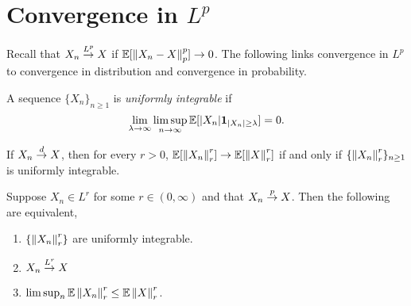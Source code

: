 \section{Convergence in $L^p$}
Recall that $X_n \stackrel{L^{p}}{\to} X$ if ${\mathbb{E}}[\left\|X_n-X\right\|_p^p] \to 0$. The following links convergence in $L^p$ to convergence in distribution and convergence in probability.
\begin{definition}
    A sequence $\{X_n\}_{n \ge 1}$ is \emph{uniformly integrable} if
    \[\lim_{\lambda \to \infty} \limsup_{n \to \infty} {\mathbb{E}}[{\left\lvert X_n\right\rvert}{{\bf 1}}_{{\left\lvert X_n\right\rvert}\ge \lambda}] = 0. \]
\end{definition}
If $X_n \stackrel{d}{\to} X$, then for every $r > 0$, ${\mathbb{E}}[\left\|X_n\right\|_r^r] \to {\mathbb{E}}[\left\|X\right\|_r^r]$ if and only if $\{\left\|X_n\right\|_r^r\}_{n \ge 1}$ is uniformly integrable.
\begin{theorem}[Vitalli]
    Suppose $X_n \in L^r$ for some $r \in(0,\infty)$ and that $X_n \stackrel{p}{\to} X$. Then the following are equivalent,
    \begin{enumerate}
        \item $\{\left\|X_n\right\|_r^r\}$ are uniformly integrable.
        \item $X_n \stackrel{L^{r}}{\to} X$
        \item $\limsup_n {\mathbb{E}}\left\|X_n\right\|_r^r \le {\mathbb{E}} \left\|X\right\|_r^r$.
    \end{enumerate}
\end{theorem}
